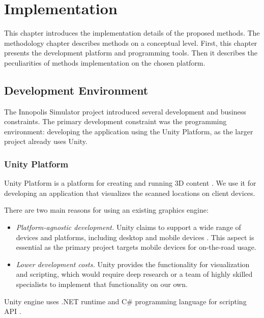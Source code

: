 \chapter{Implementation}
\label{chap:implementation}

\graphicspath{{figs/implementation/}}

This chapter introduces the implementation details of the proposed methods. The methodology chapter describes methods on a conceptual level. First, this chapter presents the development platform and programming tools. Then it describes the peculiarities of methods implementation on the chosen platform.

\section{Development Environment}

The Innopolis Simulator project introduced several development and business constraints. The primary development constraint was the programming environment: developing the application using the Unity Platform, as the larger project already uses Unity.

\subsection{Unity Platform}

Unity Platform is a platform for creating and running 3D content \cite{UnityAbout}.  We use it for developing an application that visualizes the scanned locations on client devices.

There are two main reasons for using an existing graphics engine:

\begin{itemize}
    \item \textit{Platform-agnostic development.} Unity claims to support a wide range of devices and platforms, including desktop and mobile devices \cite{UnityMultiplatform}. This aspect is essential as the primary project targets mobile devices for on-the-road usage.
    
    \item \textit{Lower development costs.} Unity provides the functionality for visualization and scripting, which would require deep research or a team of highly skilled specialists to implement that functionality on our own.
\end{itemize}

Unity engine uses .NET runtime and C\# programming language for scripting API \cite{UnityManScripts}.

